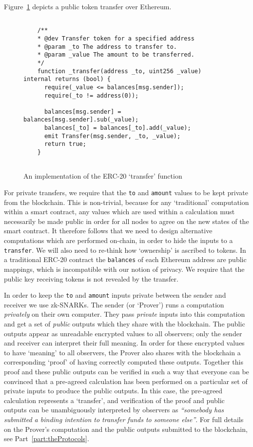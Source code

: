 Figure~\ref{fig:codeTransfer} depicts a public token transfer over Ethereum.

  \begin{figure}[h]
    \begin{lstlisting}

    /**
    * @dev Transfer token for a specified address
    * @param _to The address to transfer to.
    * @param _value The amount to be transferred.
    */
    function _transfer(address _to, uint256 _value) internal returns (bool) {
      require(_value <= balances[msg.sender]);
      require(_to != address(0));

      balances[msg.sender] = balances[msg.sender].sub(_value);
      balances[_to] = balances[_to].add(_value);
      emit Transfer(msg.sender, _to, _value);
      return true;
    }
     
    \end{lstlisting}
    \caption{An implementation of the ERC-20 `transfer' function}
    \label{fig:codeTransfer}
  \end{figure}

For private transfers, we require that the \texttt{to} and \texttt{amount} values to be kept private from the blockchain. This is non-trivial, because for any `traditional' computation within a smart contract, any values which are used within a calculation must necessarily be made public in order for all nodes to agree on the new states of the smart contract.
It therefore follows that we need to design alternative computations which are performed on-chain, in order to hide the inputs to a \texttt{transfer}. We will also need to re-think how `ownership' is ascribed to tokens. 
In a traditional ERC-20 contract the \texttt{balances} of each Ethereum address are public mappings, which is incompatible with our notion of privacy.
We require that the public key receiving tokens is not revealed by the transfer.

In order to keep the \texttt{to} and \texttt{amount} inputs private between the sender and receiver we use zk-SNARKs.
 The sender (or `Prover') runs a computation \textit{privately} on their own computer. They pass \textit{private} inputs into this computation and get a set of \textit{public} outputs which they  share with the blockchain. The public outputs appear as unreadable encrypted values to all observers; only the sender and receiver can interpret their full meaning. In order for these encrypted values to have `meaning' to all observers, the Prover also shares with the blockchain a corresponding `proof' of having correctly computed these outputs. Together this proof and these public outputs can be verified in such a way that everyone can be convinced that a pre-agreed calculation has been performed on a particular set of private inputs to produce the public outputs. In this case, the pre-agreed calculation represents a `transfer', and verification of the proof and public outputs can be unambiguously interpreted by observers as \textit{``somebody has submitted a binding intention to transfer funds to someone else''}.
For full details on the Prover's computation and the public outputs submitted to the blockchain, see Part~\ref{part:theProtocols}.

